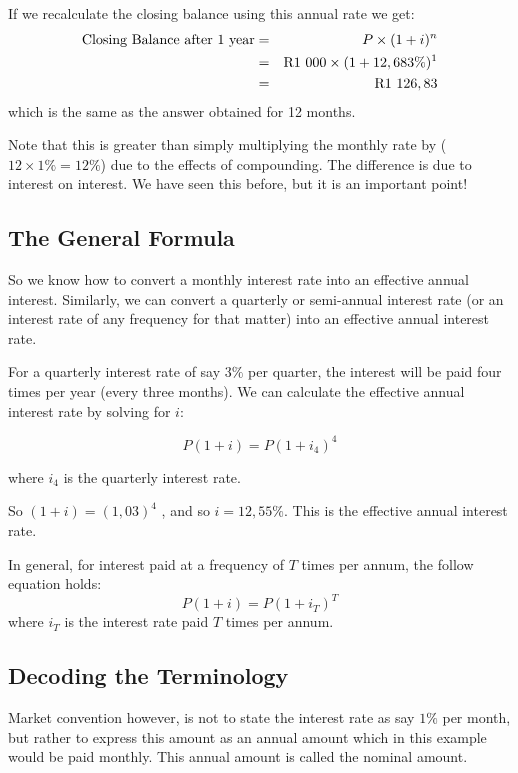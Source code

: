 If we recalculate the closing balance using this annual rate we get:
\begin{eqnarray*}
\mbox{Closing Balance after 1 year}&=& P \times (1 + i)^n \\
&=& \rm{R}1~000 \times (1 + 12,683\%)^{1} \\
&=& \rm{R}1~126,83
\end{eqnarray*}
which is the same as the answer obtained for 12 months.

Note that this is greater than simply multiplying the monthly rate by ($12 \times 1\% = 12\%$) due to the effects of compounding. The difference is due to interest on interest. We have seen this before, but it is an important point!

\subsection{The General Formula}
So we know how to convert a monthly interest rate into an effective annual interest. Similarly, we can convert a quarterly or semi-annual interest rate (or an interest rate of any frequency for that matter) into an effective annual interest rate.

For a quarterly interest rate of say $3\%$ per quarter, the interest will be paid four times per year (every three months). We can calculate the effective annual interest rate by solving for $i$:

\begin{equation*}
P(1 + i ) = P(1 + i_4 )^4
\end{equation*}

where $i_4$ is the quarterly interest rate.

So
$(1 + i ) = (1,03 )^4$ , and so $i = 12,55\%$. This is the effective annual interest rate.

In general, for interest paid at a frequency of $T$ times per annum, the follow equation holds:
\begin{equation}
P(1 + i) = P(1 + i_T)^{T}
\end{equation}
where $i_T$ is the interest rate paid $T$ times per annum.

\subsection{Decoding the Terminology}
Market convention however, is not to state the interest rate as say $1\%$ per month, but rather to express this amount as an annual amount which in this example would be paid monthly. This annual amount is called the nominal amount.

